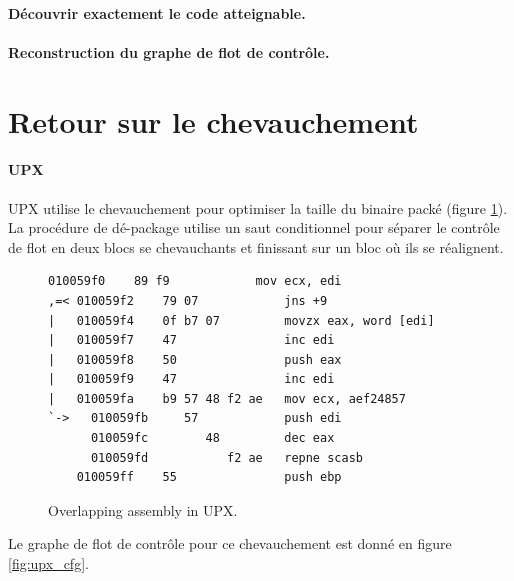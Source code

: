 
\paragraph{Découvrir exactement le code atteignable.}

\paragraph{Reconstruction du graphe de flot de contrôle.}

\section{Retour sur le chevauchement}
\paragraph{UPX}
UPX utilise le chevauchement pour optimiser la taille du binaire packé (figure \ref{fig:upx_obf_asm}).
La procédure de dé-package utilise un saut conditionnel pour séparer le contrôle de flot en deux blocs se chevauchants et finissant sur un bloc où ils se réalignent.
\begin{figure}
\scriptsize
\begin{lstlisting}[language={[x86masm]Assembler}, escapechar=~]
    010059f0    89 f9            mov ecx, edi
,=< 010059f2    79 07            jns +9
|   010059f4    0f b7 07         movzx eax, word [edi]
|   010059f7    47               inc edi
|   010059f8    50               push eax
|   010059f9    47               inc edi
|   010059fa    b9 57 48 f2 ae   mov ecx, aef24857
`->   010059fb     57            push edi
      010059fc        48         dec eax
      010059fd           f2 ae   repne scasb
    010059ff    55               push ebp
\end{lstlisting}
\caption{Overlapping assembly in UPX.\label{fig:upx_obf_asm}}
\end{figure}
Le graphe de flot de contrôle pour ce chevauchement est donné en figure \ref{fig:upx_cfg}.

